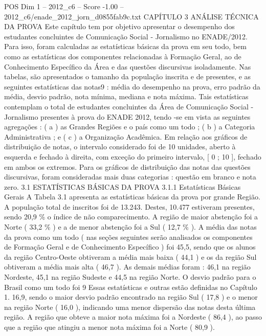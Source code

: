 \begin{textsample}{POS Dim 1 – 2012\_c6 – Score -1.00 – 2012\_c6/enade\_2012\_jorn\_d0855fab9c.txt}  \label{ex:f1_pos_183}
CAPÍTULO 3 ANÁLISE TÉCNICA DA PROVA Este capítulo tem por objetivo apresentar o desempenho dos estudantes concluintes de Comunicação Social - Jornalismo no ENADE/2012.
Para isso, foram calculadas as estatísticas básicas da prova em seu todo, bem como as estatísticas dos componentes relacionadas à Formação Geral, ao de Conhecimento Específico da Área e das questões discursivas isoladamente.
Nas tabelas, são apresentados o tamanho da população inscrita e de presentes, e as seguintes estatísticas das notas9 : média do desempenho na prova, erro padrão da média, desvio padrão, nota mínima, mediana e nota máxima.
Tais estatísticas contemplam o total de estudantes concluintes da Área de Comunicação Social - Jornalismo presentes à prova do ENADE 2012, tendo -se em vista as seguintes agregações : ( a ) as Grandes Regiões e o país como um todo ; ( b ) a Categoria Administrativa ; e ( c ) a Organização Acadêmica.
Em relação aos gráficos de distribuição de notas, o intervalo considerado foi de 10 unidades, aberto à esquerda e fechado à direita, com exceção do primeiro intervalo, [ 0 ; 10 ], fechado em ambos os extremos.
Para os gráficos de distribuição das notas das questões discursivas, foram consideradas mais duas categorias : questão em branco e nota zero. 3.1 ESTATÍSTICAS BÁSICAS DA PROVA 3.1.1 Estatísticas Básicas Gerais A Tabela 3.1 apresenta as estatísticas básicas da prova por grande Região.
A população total de inscritos foi de 13.243.
Destes, 10.477 estiveram presentes, sendo 20,9 \% o índice de não comparecimento.
A região de maior abstenção foi a Norte ( 33,2 \% ) e a de menor abstenção foi a Sul ( 12,7 \% ).
A média das notas da prova como um todo ( nas seções seguintes serão analisados os componentes de Formação Geral e de Conhecimento Específico ) foi 45,5, sendo que os alunos da região Centro-Oeste obtiveram a média mais baixa ( 44,1 ) e os da região Sul obtiveram a média mais alta ( 46,7 ).
As demais médias foram : 46,1 na região Nordeste, 45,1 na região Sudeste e 44,5 na região Norte.
O desvio padrão para o Brasil como um todo foi 9 Essas estatísticas e outras estão definidas no Capítulo 1. 16,9, sendo o maior desvio padrão encontrado na região Sul ( 17,8 ) e o menor na região Norte ( 16,0 ), indicando uma menor dispersão das notas desta última região.
A região que obteve a maior nota máxima foi a Nordeste ( 86,4 ), ao passo que a região que atingiu a menor nota máxima foi a Norte ( 80,9 ).

\end{textsample}
